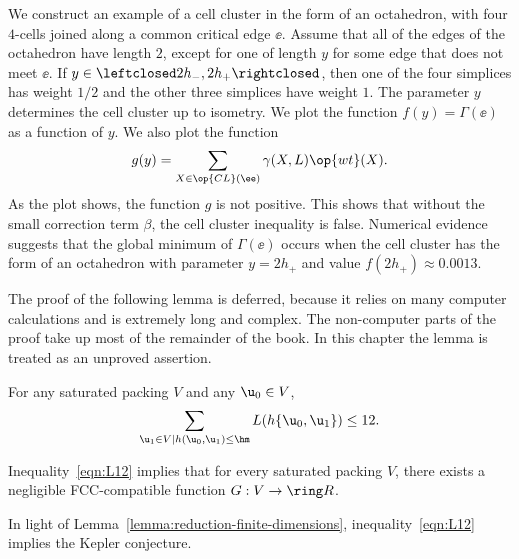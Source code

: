 \begin{cnl}
\begin{example}
  We  construct an example of a cell cluster in the form of an
  octahedron, with four $4$-cells joined along a common critical edge
  $\ee$.  Assume that all of the edges of the octahedron have length
  $2$, except for one of length $y$ for some edge that does not meet
  $\ee$.  If $y\in \leftclosed 2 h_-,2 h_+\rightclosed$, then one of
  the four simplices has weight $1/2$ and the other three simplices
  have weight $1$.  The parameter $y$ determines the cell cluster up
  to isometry.  We plot the function $f(y)=\Gamma(\ee)$
  as a function of $y$.    We also plot the function
\[
g(y) = \sumfinitepred{X}{X\in \op{CL}(\ee)} {\gammaX(X,L) \op{wt}(X)}.
\]
As the plot shows, the function $g$ is not positive.  This shows
that without the small correction term $\beta$, the cell cluster
inequality is false.  Numerical evidence suggests that the global
minimum of $\Gamma(\ee)$ occurs when the cell cluster has
the form of an octahedron with parameter $y=2h_+$ and value
$f(2h_+)\approx 0.0013$.
\end{example}
%

\figJXEHXQY %

The proof of the following lemma is deferred, because it relies on
many computer calculations and is extremely long and complex.  The
non-computer parts of the proof take up most of the remainder of the
book.  In this chapter the lemma is treated as an unproved assertion.


\begin{lemma*}
\label{conj:L12} 
%
  For any  saturated packing $ V$ and any $ \u_0\in V$,
\begin{equation}\label{eqn:L12} 
\sumfinitepred{\u_1}{\u_1\in V\mid h( \u_0, \u_1)\le \hm}{L(h\braced{\u_0, \u_1})} \le 12.
\end{equation}
\end{lemma*}


\begin{lemma}[]
\label{theorem:mk2} 
%
Inequality~\eqref{eqn:L12} implies that for every saturated packing
$V$, there exists a negligible FCC-compatible function $G:V\to \Real$.
\end{lemma}

\begin{remark}\label{rem:L12KC}
In light of Lemma~\ref{lemma:reduction-finite-dimensions}, inequality~\ref{eqn:L12}
implies the Kepler conjecture. 
\end{remark}


\end{cnl}
